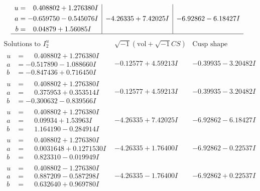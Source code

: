 \documentclass[1p]{elsarticle_modified}
\theoremstyle{definition}
\newcommand{\I}{\sqrt{-1}}
\begin{document}
$$\begin{array}{c|c|c}
\begin{aligned}
u &= \phantom{-}0.408802 + 1.276380 I \\
a &= -0.659750 - 0.545076 I \\
b &= \phantom{-}0.04879 + 1.56085 I\end{aligned}
 & -4.26335 + 7.42025 I & -6.92862 - 6.18427 I\\
 \hline 
 \end{array}$$\newpage$$\begin{array}{c|c|c}  
\text{Solutions to }I^u_{2}& \I (\text{vol} + \sqrt{-1}CS) & \text{Cusp shape}\\
 \hline 
\begin{aligned}
u &= \phantom{-}0.408802 + 1.276380 I \\
a &= -0.517890 - 1.088660 I \\
b &= -0.847436 + 0.716450 I\end{aligned}
 & -0.12577 + 4.59213 I & -0.39935 - 3.20482 I \\ \hline\begin{aligned}
u &= \phantom{-}0.408802 + 1.276380 I \\
a &= \phantom{-}0.375953 + 0.353514 I \\
b &= -0.300632 - 0.839566 I\end{aligned}
 & -0.12577 + 4.59213 I & -0.39935 - 3.20482 I \\ \hline\begin{aligned}
u &= \phantom{-}0.408802 + 1.276380 I \\
a &= \phantom{-}0.09934 + 1.53963 I \\
b &= \phantom{-}1.164190 - 0.284914 I\end{aligned}
 & -4.26335 + 7.42025 I & -6.92862 - 6.18427 I \\ \hline\begin{aligned}
u &= \phantom{-}0.408802 + 1.276380 I \\
a &= \phantom{-}0.0031648 + 0.1271530 I \\
b &= \phantom{-}0.823310 - 0.019949 I\end{aligned}
 & -4.26335 + 1.76400 I & -6.92862 - 0.22537 I \\ \hline\begin{aligned}
u &= \phantom{-}0.408802 - 1.276380 I \\
a &= \phantom{-}0.887209 - 0.587298 I \\
b &= \phantom{-}0.632640 + 0.969780 I\end{aligned}
 & -4.26335 - 1.76400 I & -6.92862 + 0.22537 I \\ \hline\begin{aligned}

\end{aligned}
\end{array}$$
\end{document}
